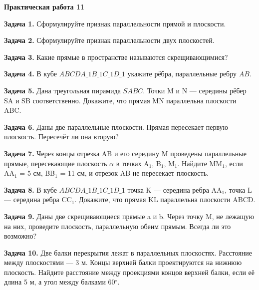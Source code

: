 \documentclass{umk-matematika}
\begin{document}
\begin{center}
{\Large\bfseries Практическая работа 11}
\end{center}
\vspace{0.5cm}

\textbf{Задача 1.} Сформулируйте признак параллельности прямой и плоскости.\par\vspace{10pt}
\textbf{Задача 2.} Сформулируйте признак параллельности двух плоскостей.\par\vspace{10pt}
\textbf{Задача 3.} Какие прямые в пространстве называются скрещивающимися?\par\vspace{10pt}
\textbf{Задача 4.} В кубе $ABCDA\_1B\_1C\_1D\_1$ укажите рёбра, параллельные ребру $AB$.\par\vspace{10pt}
\textbf{Задача 5.} Дана треугольная пирамида $SABC$. Точки M и N — середины рёбер SA и SB соответственно. Докажите, что прямая MN параллельна плоскости ABC.\par\vspace{10pt}
\textbf{Задача 6.} Даны две параллельные плоскости. Прямая пересекает первую плоскость. Пересечёт ли она вторую?\par\vspace{10pt}
\textbf{Задача 7.} Через концы отрезка AB и его середину M проведены параллельные прямые, пересекающие плоскость $\alpha$ в точках A$_1$, B$_1$, M$_1$. Найдите MM$_1$, если AA$_1$ = 5 см, BB$_1$ = 11 см, и отрезок AB не пересекает плоскость.\par\vspace{10pt}
\textbf{Задача 8.} В кубе $ABCDA\_1B\_1C\_1D\_1$ точка K — середина ребра AA$_1$, точка L — середина ребра CC$_1$. Докажите, что прямая KL параллельна плоскости ABCD.\par\vspace{10pt}
\textbf{Задача 9.} Даны две скрещивающиеся прямые a и b. Через точку M, не лежащую на них, проведите плоскость, параллельную обеим прямым. Всегда ли это возможно?\par\vspace{10pt}
\textbf{Задача 10.} Две балки перекрытия лежат в параллельных плоскостях. Расстояние между плоскостями — 3 м. Концы верхней балки проектируются на нижнюю плоскость. Найдите расстояние между проекциями концов верхней балки, если её длина 5 м, а угол между балками 60$^\circ$.\par\vspace{10pt}
\newpage
\end{document}
